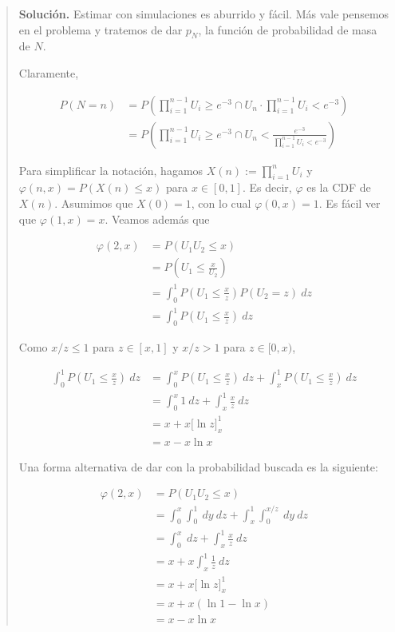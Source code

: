 \documentclass[a4paper, 12pt]{article}
\begin{document}
\begin{quote}
\textbf{Solución.} Estimar con simulaciones es aburrido y fácil. Más vale pensemos en el problema y
tratemos de dar $p_N$, la función de probabilidad de masa de $N$.

Claramente, 

\begin{align*}
  P(N = n) 
  &= P \left( \prod_{i=1}^{n-1} U_i \geq e^{-3} \cap U_n \cdot \prod_{i=1}^{n-1}
  U_i < e^{-3}\right) \\ 
  &= P \left( \prod_{i=1}^{n-1} U_i \geq e^{-3} \cap U_n  <
    \frac{e^{-3}}{\prod_{i=1}^{n-1}U_i < e^{-3}}\right) 
\end{align*}

Para simplificar la notación, hagamos $X(n) := \prod_{i=1}^n U_i$ y $\varphi(n,
x) = P(X(n) \leq x)$ para $x \in [0, 1]$. Es decir, $\varphi$ es la CDF de
$X(n)$. Asumimos que $X(0) = 1$, con lo cual $\varphi(0, x) = 1$. Es fácil ver
que $\varphi(1, x) = x$. Veamos además que 

\begin{align*}
  \varphi(2, x) 
  &= P(U_1 U_2 \leq x) \\ 
  &= P(U_1 \leq \frac{x}{U_2}) \\ 
  &= \int_0^1 P(U_1 \leq \frac{x}{z}) P(U_2 = z) ~ dz  \\ 
  &= \int_0^1 P\left( U_1 \leq \frac{x}{z} \right)  ~ dz
\end{align*}

Como $x / z \leq 1$ para $z \in [x, 1]$ y $x / z > 1$ para $z \in [0, x)$,

\begin{align*}
  \int_0^1 P\left( U_1 \leq \frac{x}{z} \right) ~ dz 
  &=\int_0^x P\left( U_1 \leq \frac{x}{z} \right) ~ dz + \int_x^1 P\left( U_1
  \leq \frac{x}{z} \right) ~ dz \\ 
  &= \int_0^x 1 ~ dz + \int_x^1 \frac{x}{z} ~ dz \\ 
  &= x + x \Big[ \ln z\Big]_x^1 \\ 
  &= x - x \ln x
\end{align*}

\begin{myframe}
  Una forma alternativa de dar con la probabilidad buscada es la siguiente:
  
\begin{align*}
  \varphi(2, x) 
  &= P(U_1 U_2 \leq x)  \\ 
  &=\int_0^x \int_0^1 ~ dy ~ dz + \int_x^1 \int_{0}^{x / z} ~ dy ~ dz \\ 
  &=\int_0^x ~ dz + \int_{x}^1 \frac{x}{z} ~ dz \\ 
  &= x + x \int_x^1 \frac{1}{z} ~ dz \\ 
  &= x + x \Big[ \ln z \Big]_{x}^1 \\ 
  &= x + x(\ln 1 - \ln x) \\ 
  &= x - x \ln x
\end{align*}


\end{myframe}
\end{quote}
\end{document}
